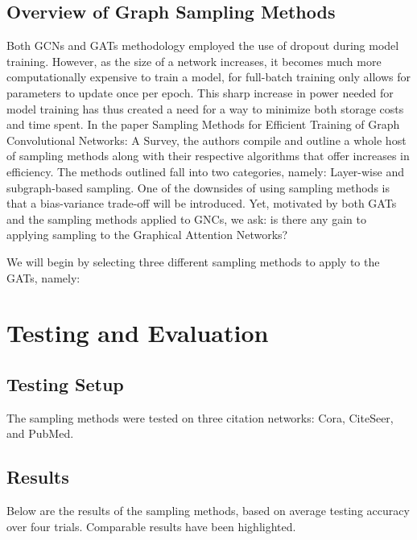 \documentclass{article}
\begin{document}
	\subsection{Overview of Graph Sampling Methods} 
	
	Both GCNs and GATs methodology employed the use of dropout during model training. However, as the size of a network increases,
	it becomes much more computationally expensive to train a model, for full-batch training only allows for parameters to update once per epoch. This sharp increase in power needed for model training has thus created a need for a way to minimize both storage costs and time spent.
	In the paper Sampling Methods for Efficient Training of Graph Convolutional Networks: A Survey, the authors compile and outline a whole host 
	of sampling methods along with their respective algorithms that offer increases in efficiency. The methods outlined fall into two categories, namely: Layer-wise and subgraph-based sampling. One of the downsides of using sampling methods
	is that a bias-variance trade-off will be introduced. Yet, motivated by both GATs and the sampling methods applied to GNCs, we ask: is there any gain to applying sampling to the Graphical Attention Networks?
	
	We will begin by selecting three different sampling methods to apply to the GATs, namely: 
	
	\section{Testing and Evaluation}
	
	\subsection{Testing Setup}
	
	The sampling methods were tested on three citation networks: Cora, CiteSeer, and PubMed. 
	
	\subsection{Results}
	
	Below are the results of the sampling methods, based on average testing accuracy over four trials. Comparable results have been highlighted.
\end{document}
